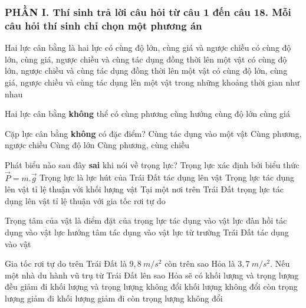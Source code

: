 \subsubsection*{PHẦN I. Thí sinh trả lời câu hỏi từ câu 1 đến câu 18. Mỗi câu hỏi thí sinh chỉ chọn một phương án}
\setcounter{ex}{0}
\begin{ex}%
Hai lực cân bằng là hai lực
\choice
{có cùng độ lớn, cùng giá và ngược chiều}
{\True có cùng độ lớn, cùng giá, ngược chiều và cùng tác dụng đồng thời lên một vật}
{có cùng độ lớn, ngược chiều và cùng tác dụng đồng thời lên một vật}
{có cùng độ lớn, cùng giá, ngược chiều và cùng tác dụng lên một vật trong những khoảng thời gian như nhau}
 \end{ex}
\begin{ex}%
Hai lực cân bằng \textbf{không} thể có
\choice
{cùng phương}
{\True cùng hướng}
{cùng độ lớn}
{cùng giá}
 \end{ex}
\begin{ex}%
Cặp lực cân bằng \textbf{không} có đặc điểm?
\choice
{Cùng tác dụng vào một vật}
{Cùng phương, ngược chiều}
{Cùng độ lớn}
{\True Cùng phương, cùng chiều}
 \end{ex}

\begin{ex}%
Phát biểu nào sau đây \textbf{sai} khi nói về trọng lực?
\choice
{Trọng lực xác định bởi biểu thức $\vec{P}=m . \vec{g}$}
{Trọng lực là lực hút của Trái Đất tác dụng lên vật}
{Trọng lực tác dụng lên vật tỉ lệ thuận với khối lượng vật}
{\True Tại một nơi trên Trái Đất trọng lực tác dụng lên vật tỉ lệ thuận với gia tốc rơi tự do}
 \end{ex}
\begin{ex}%
Trọng tâm của vật là điểm đặt của
\choice
{\True trọng lực tác dụng vào vật}
{lực đàn hồi tác dụng vào vật}
{lực hướng tâm tác dụng vào vật}
{lực từ trường Trái Đất tác dụng vào vật}
 \end{ex}
\begin{ex}%
Gia tốc rơi tự do trên Trái Đất là $9,8 \ m / s^2$ còn trên sao Hỏa là $3,7 \ m / s^2$. Nếu một nhà du hành vũ trụ từ Trái Đất lên sao Hỏa sẽ có
\choice
{khối lượng và trọng lượng đều giảm đi}
{khối lượng và trọng lượng không đổi}
{\True khối lượng không đổi còn trọng lượng giảm đi}
{khối lượng giảm đi còn trọng lượng không đổi}
 \end{ex}


